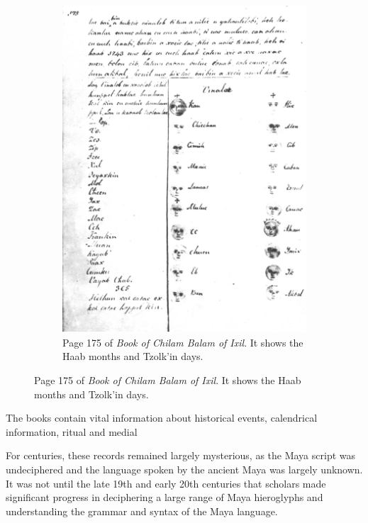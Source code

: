 \documentclass[../main.tex]{subfiles}
\begin{document}
\begin{figure}
\begin{subfigure}[b]{0.49\textwidth}
        \includegraphics[width=\textwidth]{img/chilam-balam-of-ixil-page-175}
        \caption{Page 175 of \emph{Book of Chilam Balam of Ixil}.
                 It shows the Haab months and Tzolk'in days.}
        \label{fig:introduction-chilam-balam-of-ixil-page-175}
    \end{subfigure}
\end{figure}


The books contain vital information about historical events, calendrical information, ritual and
medial  

For centuries, these records remained largely mysterious, as the Maya script was 
undeciphered and the language spoken by the ancient Maya was largely unknown.
It was not until the late 19th and early 20th centuries that scholars made significant progress 
in deciphering a large range of Maya hieroglyphs and understanding the grammar and syntax of 
the Maya language. 
\end{document}
